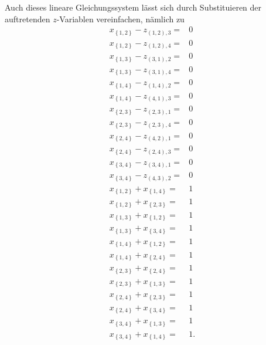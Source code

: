 \documentclass[10p,a4paper,BCOR = 12mm, DIV=15]{scrbook}
\begin{document}
\begin{bew}
Auch dieses lineare Gleichungssystem lässt sich durch Substituieren der auftretenden $z$-Variablen vereinfachen, nämlich zu
{
\allowdisplaybreaks
\begin{align*}
x_{\left\{1, 2\right\}} - z_{\left(1, 2\right), 3} = & 0 \\
x_{\left\{1, 2\right\}} - z_{\left(1, 2\right), 4} = & 0 \\
x_{\left\{1, 3\right\}} - z_{\left(3, 1\right), 2} = & 0 \\
x_{\left\{1, 3\right\}} - z_{\left(3, 1\right), 4} = & 0 \\
x_{\left\{1, 4\right\}} - z_{\left(1, 4\right), 2} = & 0 \\
x_{\left\{1, 4\right\}} - z_{\left(4, 1\right), 3} = & 0 \\
x_{\left\{2, 3\right\}} - z_{\left(2, 3\right), 1} = & 0 \\
x_{\left\{2, 3\right\}} - z_{\left(2, 3\right), 4} = & 0 \\
x_{\left\{2, 4\right\}} - z_{\left(4, 2\right), 1} = & 0 \\
x_{\left\{2, 4\right\}} - z_{\left(2, 4\right), 3} = & 0 \\
x_{\left\{3, 4\right\}} - z_{\left(3, 4\right), 1} = & 0 \\
x_{\left\{3, 4\right\}} - z_{\left(4, 3\right), 2} = & 0 \\
x_{\left\{1, 2\right\}} + x_{\left\{1, 4\right\}} = & 1 \\
x_{\left\{1, 2\right\}} + x_{\left\{2, 3\right\}} = & 1 \\
x_{\left\{1, 3\right\}} + x_{\left\{1, 2\right\}} = & 1 \\
x_{\left\{1, 3\right\}} + x_{\left\{3, 4\right\}} = & 1 \\
x_{\left\{1, 4\right\}} + x_{\left\{1, 2\right\}} = & 1 \\
x_{\left\{1, 4\right\}} + x_{\left\{2, 4\right\}} = & 1 \\
x_{\left\{2, 3\right\}} + x_{\left\{2, 4\right\}} = & 1 \\
x_{\left\{2, 3\right\}} + x_{\left\{1, 3\right\}} = & 1 \\
x_{\left\{2, 4\right\}} + x_{\left\{2, 3\right\}} = & 1 \\
x_{\left\{2, 4\right\}} + x_{\left\{3, 4\right\}} = & 1 \\
x_{\left\{3, 4\right\}} + x_{\left\{1, 3\right\}} = & 1 \\
x_{\left\{3, 4\right\}} + x_{\left\{1, 4\right\}} = & 1.
\end{align*}
}


\end{bew}
\end{document}
